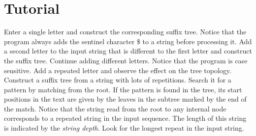 \section{Tutorial}
\begin{itemize}
  \I Enter a single letter and construct the corresponding suffix
  tree. Notice that the program always adds the sentinel character
  $\mathtt{\$}$ to
  a string before processing it.
  \I Add a second letter to the input string that is different to the
  first letter and construct the suffix tree.
  \I Continue adding different letters. Notice that the program is case sensitive.
  \I Add a repeated letter and observe the effect on the tree
  topology.
  \I Construct a suffix tree from a string with lots of
  repetitions. Search it for a pattern by matching from the root. If
  the pattern is found in the tree, its start positions in the text are given by the leaves in
  the subtree marked by the end of the match.
  \I Notice that the string read from the root to any internal node
  corresponds to a repeated string in the input sequence. The length
  of this string is indicated by the \textit{string depth}. Look for the longest
  repeat in the input string.
\end{itemize}






